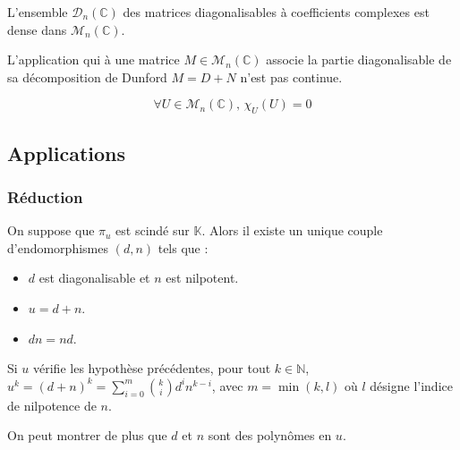 
  \begin{proposition}
    L'ensemble $\mathcal{D}_n(\mathbb{C})$ des matrices diagonalisables à coefficients complexes est dense dans $\mathcal{M}_n(\mathbb{C})$.
  \end{proposition}

  \begin{application}
    L'application qui à une matrice $M \in \mathcal{M}_n(\mathbb{C})$ associe la partie diagonalisable de sa décomposition de Dunford $M = D + N$ n'est pas continue.
  \end{application}


  \begin{application}
    \[ \forall U \in \mathcal{M}_n(\mathbb{C}), \, \chi_U(U) = 0 \]
  \end{application}

  \subsection{Applications}

  \subsubsection{Réduction}


  \begin{theorem}
    On suppose que $\pi_u$ est scindé sur $\mathbb{K}$. Alors il existe un unique couple d'endomorphismes $(d, n)$ tels que :
    \begin{itemize}
      \item $d$ est diagonalisable et $n$ est nilpotent.
      \item $u = d + n$.
      \item $d n = n d$.
    \end{itemize}
  \end{theorem}

  \begin{corollary}
    Si $u$ vérifie les hypothèse précédentes, pour tout $k \in \mathbb{N}$, $u^k = (d + n)^k = \sum_{i=0}^m \binom{k}{i} d^i n^{k-i}$, avec $m = \min(k, l)$ où $l$ désigne l'indice de nilpotence de $n$.
  \end{corollary}

  \begin{remark}
    On peut montrer de plus que $d$ et $n$ sont des polynômes en $u$.
  \end{remark}

